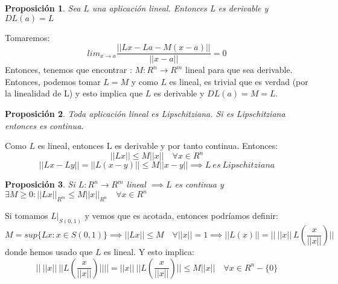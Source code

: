 \documentclass[11pt, a4paper, titlepage]{article}
\makeatletter
\renewenvironment{proof}[1][\proofname] {\vspace{-15pt}\par\pushQED{\qed}\normalfont\topsep6\p@\@plus6\p@\relax\trivlist\item[\hskip\labelsep\it#1\@addpunct{.}]\ignorespaces}{\popQED\endtrivlist\@endpefalse}
\theoremstyle{theorem-style}
\newtheorem*{nprop}{Proposición}
\theoremstyle{definition-style}
\theoremstyle{remark-style}
\theoremstyle{example-style}
\makeatother
\begin{document}
\begin{nprop}
	Sea $L$ una aplicación lineal. Entonces L es derivable y $DL(a) = L$
	
\end{nprop}
\begin{proof}
	
	Tomaremos:
	\[
	lim_{x\to a} \frac{||Lx -La - M(x-a)||}{||x-a||}= 0
	\]
	Entonces, tenemos que encontrar : $M: R^n \to R^m$ lineal para que sea derivable. Entonces, podemos tomar $L=M$ y como $L$ es lineal, es trivial que es verdad (por la linealidad de L) y esto implica que $L$ es derivable y $DL(a) = M = L$. 
\end{proof}

\begin{nprop}
	Toda aplicación lineal es Lipschitziana. Si es Lipschitziana entonces es continua.
\end{nprop}
\begin{proof}
	Como $L$ es lineal, entonces L es derivable y por tanto continua. Entonces:
	\[
	||Lx|| \leq M||x|| \quad \forall x \in R^n	
	\]
	\[
	 ||Lx-Ly|| = ||L(x-y) || \leq M||x-y|| \implies L\ es \ Lipschitziana
	\]
\end{proof}


\begin{nprop}
	Si $L:R^n \to R^m$ lineal $\implies L $ es continua y $\exists M \geq 0: ||Lx||_{R^m} \leq M ||x||_{R^n} \quad \forall x \in R^n$
\end{nprop}
\begin{proof}
	Si tomamos $L|_{S(0,1)}$ y vemos que es acotada, entonces podríamos definir: \[M = sup\{Lx : x \in S(0,1)\} \implies ||Lx|| \leq M \quad \forall ||x|| = 1 \implies ||L(x)|| = ||\ ||x||\ L(\frac{x}{||x||}) ||\] donde hemos usado que $L$ es lineal. Y esto implica: \[||\ ||x||\ || L(\frac{x}{||x||})|| || = ||x||\ || L(\frac{x}{||x||}) || \leq M||x|| \quad \forall x \in R^n-\{0\}\]
\end{proof}
\end{document}
